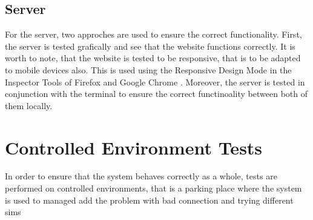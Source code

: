 \subsection{Server}

For the server, two approches are used to ensure the correct functionality. First, the server is tested grafically and see that the website functions correctly. It is worth to note, that the website is tested to be responsive, that is to be adapted to mobile devices also. This is used using the Responsive Design Mode in the Inspector Tools of Firefox and Google Chrome . Moreover, the server is tested in conjunction with the terminal to ensure the correct functinoality between both of them locally.

\section{Controlled Environment Tests}

In order to ensure that the system behaves correctly as a whole, tests are performed on controlled environments, that is a parking place where the system is used to managed
add the problem with bad connection and trying different sims


